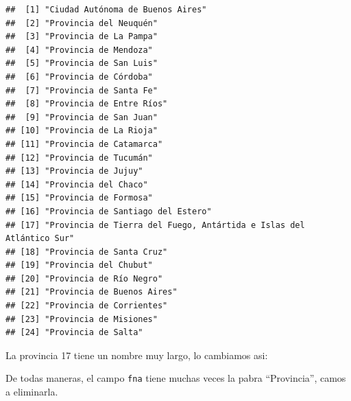 \documentclass[]{book}
\newenvironment{Shaded}{\begin{snugshade}}{\end{snugshade}}
\newcommand{\DataTypeTok}[1]{\textcolor[rgb]{0.13,0.29,0.53}{#1}}
\newcommand{\DecValTok}[1]{\textcolor[rgb]{0.00,0.00,0.81}{#1}}
\newcommand{\KeywordTok}[1]{\textcolor[rgb]{0.13,0.29,0.53}{\textbf{#1}}}
\newcommand{\NormalTok}[1]{#1}
\newcommand{\OperatorTok}[1]{\textcolor[rgb]{0.81,0.36,0.00}{\textbf{#1}}}
\newcommand{\StringTok}[1]{\textcolor[rgb]{0.31,0.60,0.02}{#1}}
\begin{document}
\begin{verbatim}
##  [1] "Ciudad Autónoma de Buenos Aires"                                   
##  [2] "Provincia del Neuquén"                                             
##  [3] "Provincia de La Pampa"                                             
##  [4] "Provincia de Mendoza"                                              
##  [5] "Provincia de San Luis"                                             
##  [6] "Provincia de Córdoba"                                              
##  [7] "Provincia de Santa Fe"                                             
##  [8] "Provincia de Entre Ríos"                                           
##  [9] "Provincia de San Juan"                                             
## [10] "Provincia de La Rioja"                                             
## [11] "Provincia de Catamarca"                                            
## [12] "Provincia de Tucumán"                                              
## [13] "Provincia de Jujuy"                                                
## [14] "Provincia del Chaco"                                               
## [15] "Provincia de Formosa"                                              
## [16] "Provincia de Santiago del Estero"                                  
## [17] "Provincia de Tierra del Fuego, Antártida e Islas del Atlántico Sur"
## [18] "Provincia de Santa Cruz"                                           
## [19] "Provincia del Chubut"                                              
## [20] "Provincia de Río Negro"                                            
## [21] "Provincia de Buenos Aires"                                         
## [22] "Provincia de Corrientes"                                           
## [23] "Provincia de Misiones"                                             
## [24] "Provincia de Salta"
\end{verbatim}

La provincia 17 tiene un nombre muy largo, lo cambiamos asi:

\begin{Shaded}
\end{Shaded}

De todas maneras, el campo \texttt{fna} tiene muchas veces la pabra ``Provincia'', camos a eliminarla.

\begin{Shaded}
\end{Shaded}
\end{document}
